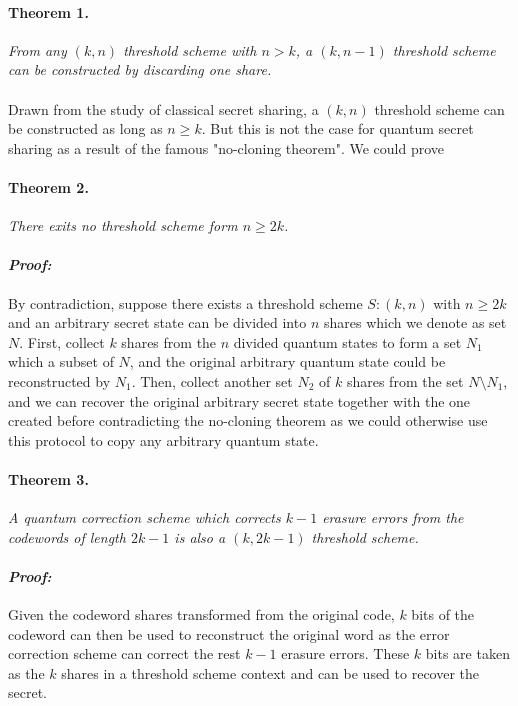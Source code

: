 \documentclass[12pt]{article}
\begin{document}
\paragraph{Theorem 1.}
\textit{From any $(k,n)$ threshold scheme with $n > k$, a $(k, n-1)$ threshold scheme can be constructed by discarding one share.}  \\ \\
Drawn from the study of classical secret sharing, a $(k,n)$ threshold scheme can be constructed as long as $n \ge k$. But this is not the case for quantum secret sharing as a result of the famous "no-cloning theorem". We could prove 
\paragraph{Theorem 2.}
\textit{There exits no threshold scheme form $n \ge 2k $.}
\paragraph{\textit{Proof:}}
By contradiction, suppose there exists a threshold scheme $S:(k, n)$ with $n \ge 2k$ and an arbitrary secret state can be divided into $n$ shares which we denote as set $N$.
First, collect $k$ shares from the $n$ divided quantum states to form a set $N_1$ which a subset of $N$, and the original arbitrary quantum state could be reconstructed by $N_1$.
Then, collect another set $N_2$ of $k$ shares from the set $N \setminus N_1$, and we can recover the original arbitrary secret state together with the one created before contradicting the no-cloning theorem as we could otherwise use this protocol to copy any arbitrary quantum state.
\paragraph{Theorem 3.}
\textit{A quantum correction scheme which corrects $k-1$ erasure errors from the codewords of length $2k-1$ is also a $(k,2k-1)$ threshold scheme.}
\paragraph{\textit{Proof:}}
Given the codeword shares transformed from the original code, $k$ bits of the codeword can then be used to reconstruct the original word as the error correction scheme can correct the rest $k-1$ erasure errors. These $k$ bits are taken as the $k$ shares in a threshold scheme context and can be used to recover the secret.
\end{document}
